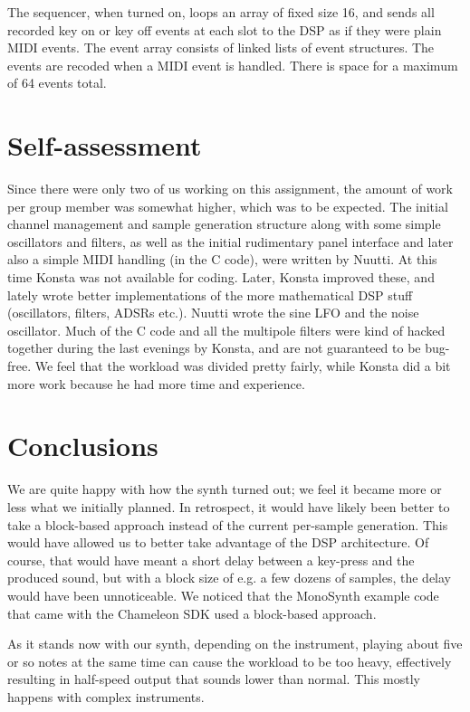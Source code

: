 \documentclass[10pt,a4paper,oneside]{article}
\begin{document}
The sequencer, when turned on, loops an array of fixed size 16, and sends all recorded key on or key off events at each slot to the DSP as if they were plain MIDI events. The event array consists of linked lists of event structures. The events are recoded when a MIDI event is handled. There is space for a maximum of 64 events total.


\section{Self-assessment}

Since there were only two of us working on this assignment, the amount of work per group member was somewhat higher, which was to be expected. The initial channel management and sample generation structure along with some simple oscillators and filters, as well as the initial rudimentary panel interface and later also a simple MIDI handling (in the C code), were written by Nuutti. At this time Konsta was not available for coding. Later, Konsta improved these, and lately wrote better implementations of the more mathematical DSP stuff (oscillators, filters, ADSRs etc.). Nuutti wrote the sine LFO and the noise oscillator. Much of the C code and all the multipole filters were kind of hacked together during the last evenings by Konsta, and are not guaranteed to be bug-free. We feel that the workload was divided pretty fairly, while Konsta did a bit more work because he had more time and experience.


\section{Conclusions}

We are quite happy with how the synth turned out; we feel it became more or less what we initially planned. In retrospect, it would have likely been better to take a block-based approach instead of the current per-sample generation. This would have allowed us to better take advantage of the DSP architecture. Of course, that would have meant a short delay between a key-press and the produced sound, but with a block size of e.g. a few dozens of samples, the delay would have been unnoticeable. We noticed that the MonoSynth example code that came with the Chameleon SDK used a block-based approach.

As it stands now with our synth, depending on the instrument, playing about five or so notes at the same time can cause the workload to be too heavy, effectively resulting in half-speed output that sounds lower than normal. This mostly happens with complex instruments.
\end{document}
